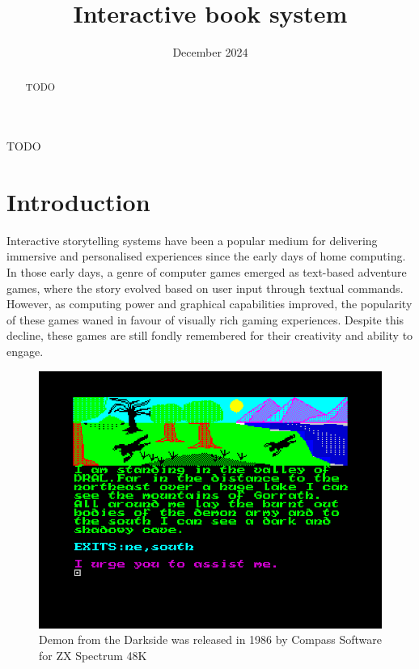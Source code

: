 \documentclass[conference]{IEEEtran}
\begin{document}
	
	\title{Interactive book system}
	
	\author{
		\date{December 2024}
	}
	
	\maketitle
	
	\begin{abstract}
		TODO
	\end{abstract}
	
	\begin{IEEEkeywords}
		TODO
	\end{IEEEkeywords}
	
	\section{Introduction}
	
	Interactive storytelling systems have been a popular medium for delivering immersive and personalised experiences since the early days of home computing. In those early days, a genre of computer games emerged as text-based adventure games, where the story evolved based on user input through textual commands\cite{brooker2021filling}\cite{woodcock2012zx}. However, as computing power and graphical capabilities improved, the popularity of these games waned in favour of visually rich gaming experiences. Despite this decline, these games are still fondly remembered for their creativity and ability to engage.
	
	
	\begin{figure}[!h]
		\centering
		\includegraphics[width=0.7\linewidth]{img/img-ari3333-project-report-adventure-games}
		\caption{Demon from the Darkside was released in 1986 by Compass Software for ZX Spectrum 48K\cite{demonfromdarkside2020}}
		\label{fig:img-ari3333-project-report-adventure-games}
	\end{figure}
	
\end{document}
